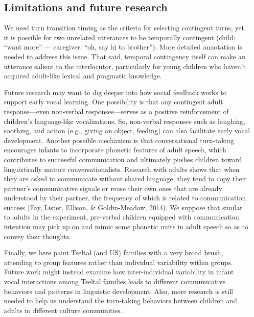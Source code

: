 \documentclass[
  man]{apa6}
\begin{document}
\hypertarget{limitations-and-future-research}{%
\subsection{Limitations and future research}\label{limitations-and-future-research}}

We used turn transition timing as the criteria for selecting contingent turns, yet it is possible for two unrelated utterances to be temporally contingent (child: ``want more'' --- caregiver: ``oh, say hi to brother''). More detailed annotation is needed to address this issue. That said, temporal contingency itself can make an utterance salient to the interlocutor, particularly for young children who haven't acquired adult-like lexical and pragmatic knowledge.

Future research may want to dig deeper into how social feedback works to support early vocal learning. One possibility is that any contingent adult response---even non-verbal responses---serves as a positive reinforcement of children's language-like vocalizations. So, non-verbal responses such as laughing, soothing, and action (e.g., giving an object, feeding) can also facilitate early vocal development. Another possible mechanism is that conversational turn-taking encourages infants to incorporate phonetic features of adult speech, which contributes to successful communication and ultimately pushes children toward linguistically mature conversationalists. Research with adults shows that when they are asked to communicate without shared language, they tend to copy their partner's communicative signals or reuse their own ones that are already understood by their partner, the frequency of which is related to communication success (Fay, Lister, Ellison, \& Goldin-Meadow, 2014). We suppose that similar to adults in the experiment, pre-verbal children equipped with communication intention may pick up on and mimic some phonetic units in adult speech so as to convey their thoughts.

Finally, we here paint Tseltal (and US) families with a very broad brush, attending to group features rather than individual variability within groups. Future work might instead examine how inter-individual variability in infant vocal interactions among Tseltal families leads to different communicative behaviors and patterns in linguistic development. Also, more research is still needed to help us understand the turn-taking behaviors between children and adults in different culture communities.
\end{document}
